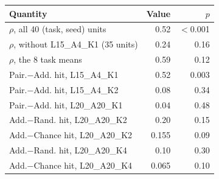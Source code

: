 \begin{tabular}{lrr}
\toprule
Quantity & Value & $p$\\
\midrule
$\rho$, all 40 (task, seed) units & 0.52 & $<$0.001\\
$\rho$, without L15\_A4\_K1 (35 units) & 0.24 & 0.16\\
$\rho$, the 8 task means & 0.59 & 0.12\\
\midrule
Pair.$-$Add. hit, L15\_A4\_K1 & 0.52 & 0.003\\
Pair.$-$Add. hit, L15\_A4\_K2 & 0.08 & 0.34\\
Pair.$-$Add. hit, L20\_A20\_K1 & 0.04 & 0.48\\
\midrule
Add.$-$Rand. hit, L20\_A20\_K2 & 0.20 & 0.15\\
Add.$-$Chance hit, L20\_A20\_K2 & 0.155 & 0.09\\
Add.$-$Rand. hit, L20\_A20\_K4 & 0.10 & 0.30\\
Add.$-$Chance hit, L20\_A20\_K4 & 0.065 & 0.10\\
\bottomrule
\end{tabular}
